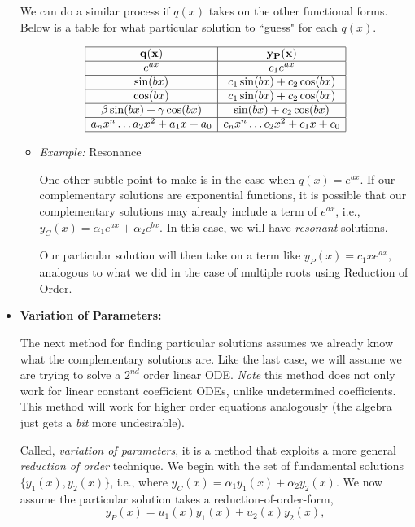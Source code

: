 \begin{itemize}
We can do a similar process if $q(x)$ takes on the other functional forms. Below is a table for what particular solution to ``guess" for each $q(x)$.

$$\begin{array}{|c|c|}
\hline 
{\bf{q(x)}}   & {\bf{y_P(x)}} \\
\hline
e^{ax}   & c_1 e^{ax}\\
\hline
\sin(bx) & c_1 \sin(bx) + c_2\cos(bx) \\
\hline
\cos(bx) & c_1 \sin(bx) + c_2\cos(bx) \\
\hline
\beta \sin(bx)+ \gamma \cos(bx) & \sin(bx) + c_2\cos(bx) \\
\hline
a_n x^n \ldots a_2x^2 + a_1 x + a_0 & c_n x^n \ldots c_2x^2 + c_1 x + c_0 \\
\hline
\end{array}$$

\begin{itemize}
\item \emph{Example:} Resonance

One other subtle point to make is in the case when $q(x) = e^{ax}$. If our complementary solutions are exponential functions, it is possible that our complementary solutions may already include a term of $e^{ax}$, i.e., $y_C(x) = \alpha_1 e^{ax} + \alpha_2 e^{bx}.$ In this case, we will have \emph{resonant} solutions. 

Our particular solution will then take on a term like $y_P(x) = c_1 x e^{ax},$ analogous to what we did in the case of multiple roots using Reduction of Order.

\end{itemize}


%
%
\item {\bf{Variation of Parameters:}}

The next method for finding particular solutions assumes we already know what the complementary solutions are. Like the last case, we will assume we are trying to solve a $2^{nd}$ order linear ODE. \emph{Note} this method does not only work for linear constant coefficient ODEs, unlike undetermined coefficients.  This method will work for higher order equations analogously (the algebra just gets a \emph{bit} more undesirable).

Called, \emph{variation of parameters}, it is a method that exploits a more general \emph{reduction of order} technique. We begin with the set of fundamental solutions $\{ y_1(x), y_2(x) \}$, i.e., where $y_C(x) = \alpha_1 y_1(x) + \alpha_2 y_2(x).$ We now assume the particular solution takes a reduction-of-order-form,
\begin{equation}
\label{vop_form} y_P(x) = u_1(x) y_1(x) + u_2(x) y_2(x),
\end{equation}


\end{itemize}
